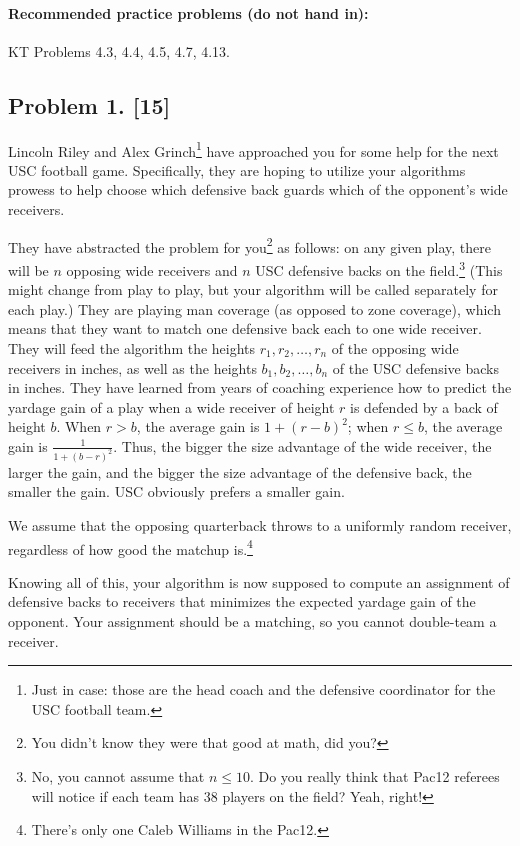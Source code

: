 \documentclass[10pt]{article}
\begin{document}
\paragraph{Recommended practice problems (do not hand in):} KT Problems 4.3, 4.4, 4.5, 4.7, 4.13. 


\newpage

\subsection*{Problem 1. [15]}

Lincoln Riley and Alex Grinch\footnote{Just in case: those are the head coach and the defensive coordinator for the USC football team.} have approached you for some help for the next USC football game.
Specifically, they are hoping to utilize your algorithms prowess to help choose which defensive back guards which of the opponent's wide receivers.

They have abstracted the problem for you\footnote{You didn't know they were that good at math, did you?} as follows: on any given play, there will be $n$ opposing wide receivers and $n$ USC defensive backs on the field.\footnote{No, you cannot assume that $n \leq 10$. Do you really think that Pac12 referees will notice if each team has 38 players on the field? Yeah, right!} (This might change from play to play, but your algorithm will be called separately for each play.)
They are playing man coverage (as opposed to zone coverage), which means that they want to match one defensive back each to one wide receiver.
They will feed the algorithm the heights $r_1, r_2, \ldots, r_n$ of the opposing wide receivers in inches, as well as the heights $b_1, b_2, \ldots, b_n$ of the USC defensive backs in inches. They have learned from years of coaching experience how to predict the yardage gain of a play when a wide receiver of height $r$ is defended by a back of height $b$. When $r > b$, the average gain is $1+(r-b)^2$; when $r \leq b$, the average gain is $\frac{1}{1+(b-r)^2}$. Thus, the bigger the size advantage of the wide receiver, the larger the gain, and the bigger the size advantage of the defensive back, the smaller the gain. USC obviously prefers a smaller gain.

We assume that the opposing quarterback throws to a uniformly random receiver, regardless of how good the matchup is.\footnote{There's only one Caleb Williams in the Pac12.} 

Knowing all of this, your algorithm is now supposed to compute an assignment of defensive backs to receivers that minimizes the expected yardage gain of the opponent. Your assignment should be a matching, so you cannot double-team a receiver.
\end{document}
